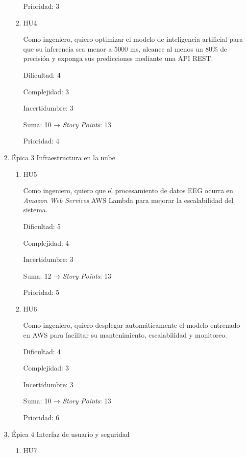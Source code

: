 \documentclass[
11pt, %
]{charter}
\begin{document}
\begin{enumerate}
\begin{enumerate}
		Prioridad: 3\newline
		
		\item HU4
		
		Como ingeniero, quiero optimizar el modelo de inteligencia artificial para que su inferencia sea menor a 5000 ms, alcance al menos un 80\% de precisión y exponga sus predicciones mediante una API REST.\newline
		
		Dificultad: 4
		
		Complejidad: 3
		
		Incertidumbre: 3
		
		Suma: 10 → \textit{Story Points}: 13

		Prioridad: 4\newline
	\end{enumerate}
	\item Épica 3  Infraestructura en la nube
	\begin{enumerate}
		\item HU5
		
		Como ingeniero, quiero que el procesamiento de datos EEG ocurra en \textit{Amazon Web Services} AWS Lambda para mejorar la escalabilidad del sistema.\newline
		
		Dificultad: 5
		
		Complejidad: 4
		
		Incertidumbre: 3
		
		Suma: 12 → \textit{Story Points}: 13

		Prioridad: 5\newline
		
		\item HU6
		
		Como ingeniero, quiero desplegar automáticamente el modelo entrenado en AWS para facilitar su mantenimiento, escalabilidad y monitoreo.\newline
		
		Dificultad: 4
		
		Complejidad: 3
		
		Incertidumbre: 3
		
		Suma: 10 → \textit{Story Points}: 13

		Prioridad: 6\newline
	\end{enumerate}
	\item Épica 4  Interfaz de usuario y seguridad
	\begin{enumerate}
		\item HU7
		

\end{enumerate}
\end{enumerate}
\end{document}
